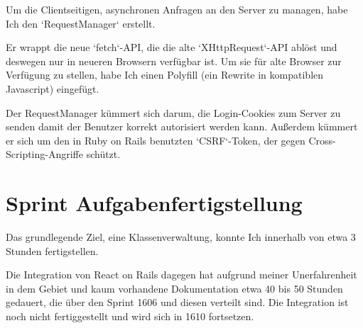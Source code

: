 \documentclass[a4paper,10pt]{scrartcl}
\begin{document}
    Um die Clientseitigen, asynchronen Anfragen an den Server zu managen, habe
    Ich den `RequestManager` erstellt.

    Er wrappt die neue `fetch`-API, die die alte `XHttpRequest`-API ablöst und
    deswegen nur in neueren Browsern verfügbar ist.
    Um sie für alte Browser zur Verfügung zu stellen, habe Ich einen Polyfill
    (ein Rewrite in kompatiblen Javascript) eingefügt.

    Der RequestManager kümmert sich darum, die Login-Cookies zum Server zu
    senden damit der Benutzer korrekt autorisiert werden kann.
    Außerdem kümmert er sich um den in Ruby on Rails benutzten `CSRF`-Token,
    der gegen Cross-Scripting-Angriffe schützt.

\section{Sprint Aufgabenfertigstellung}

  Das grundlegende Ziel, eine Klassenverwaltung, konnte Ich innerhalb von
  etwa 3 Stunden fertigstellen.

  Die Integration von React on Rails dagegen hat aufgrund meiner
  Unerfahrenheit in dem Gebiet und kaum vorhandene Dokumentation etwa 40 bis
  50 Stunden gedauert, die über den Sprint 1606 und diesen verteilt sind.
  Die Integration ist noch nicht fertiggestellt und wird sich in 1610
  fortsetzen.
\end{document}
